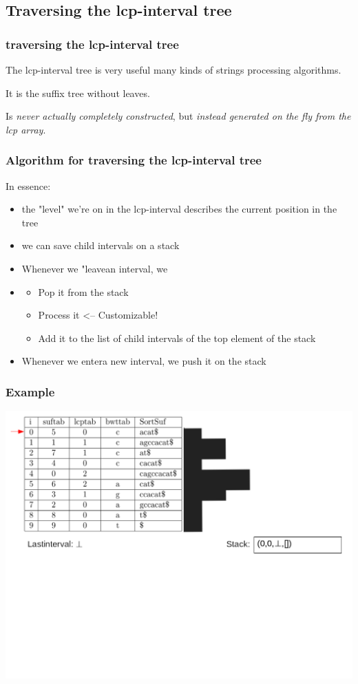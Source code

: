 \documentclass[compress,handout]{beamer} %
\begin{document}
\subsection{Traversing the lcp-interval tree}

\begin{frame}
	\frametitle{traversing the lcp-interval tree}
	The lcp-interval tree is very useful many kinds of strings
	processing algorithms.

	It is the suffix tree without leaves.

	Is {\em{never actually completely constructed}}, but {\em{instead
	generated on the fly from the lcp array}}.
\end{frame}

\begin{frame}
	\frametitle{Algorithm for traversing the lcp-interval tree}
	In essence:

	\begin{itemize}
		\item the "level" we're on in the lcp-interval describes the current position in the tree
		\item we can save child intervals on a stack
		\item Whenever we "leave\dq an interval, we
		\item \begin{itemize}
			\item Pop it from the stack
			\item Process it <-- Customizable!
			\item Add it to the list of child intervals of the top element of the stack
		\end{itemize}
		\item Whenever we \dq enter\dq a new interval, we push it on the stack
	\end{itemize}
\end{frame}

\begin{frame}
	\frametitle{Example}
	\includegraphics[width=\textwidth, height=\textheight, keepaspectratio=true]{traversal_1}
\end{frame}
\end{document}
